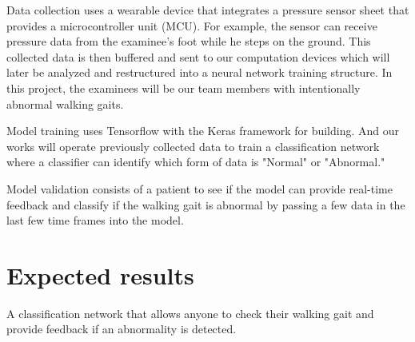 \documentclass[10pt,twocolumn,letterpaper]{article}
\begin{document}
Data collection uses a wearable device that integrates a pressure sensor sheet that provides a microcontroller unit (MCU). For example, the sensor can receive pressure data from the examinee's foot while he steps on the ground. This collected data is then buffered and sent to our computation devices which will later be analyzed and restructured into a neural network training structure. In this project, the examinees will be our team members with intentionally abnormal walking gaits.

Model training uses Tensorflow with the Keras framework for building. And our works will operate previously collected data to train a classification network where a classifier can identify which form of data is "Normal" or "Abnormal."

Model validation consists of a patient to see if the model can provide real-time feedback and classify if the walking gait is abnormal by passing a few data in the last few time frames into the model.

\section{Expected results}

A classification network that allows anyone to check their walking gait and provide feedback if an abnormality is detected.

{\small


}
\end{document}
